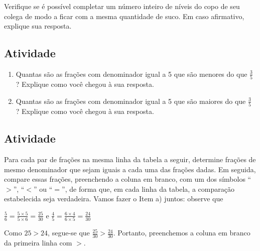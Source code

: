 \documentclass[a4,12pt]{book}
\begin{document}
Verifique se é possível completar um número inteiro de níveis do copo de seu colega de modo a ficar com a mesma quantidade de suco. Em caso afirmativo, explique sua resposta.

\subsection{Atividade}

\begin{enumerate} [\quad a)] %
  \item     Quantas são as frações com denominador igual a 5 que são menores do que     $\frac{3}{5}$    ? Explique como você chegou à sua resposta.
  \item     Quantas são as frações com denominador igual a 5 que são maiores do que     $\frac{3}{5}$    ? Explique como você chegou à sua resposta.
\end{enumerate} %

\subsection{Atividade}

Para cada par de frações na mesma linha da tabela a seguir, determine frações de mesmo denominador que sejam iguais a cada uma das frações dadas. Em seguida, compare essas frações, preenchendo a coluna em branco, com um dos símbolos ``$>$'', ``$<$'' ou ``$=$'', de forma que, em cada linha da tabela, a comparação estabelecida seja verdadeira. Vamos fazer o Item a) juntos: observe que

$\frac{5}{6} = \frac{5 \times 5}{5 \times 6} = \frac{25}{30}$ e $\frac{4}{5} = \frac{6 \times 4}{6 \times 5} = \frac{24}{30}$

Como $25 > 24$, segue-se que $\frac{25}{30} > \frac{24}{30}$. Portanto, preenchemos a coluna em branco da primeira linha com $>$.
\end{document}
